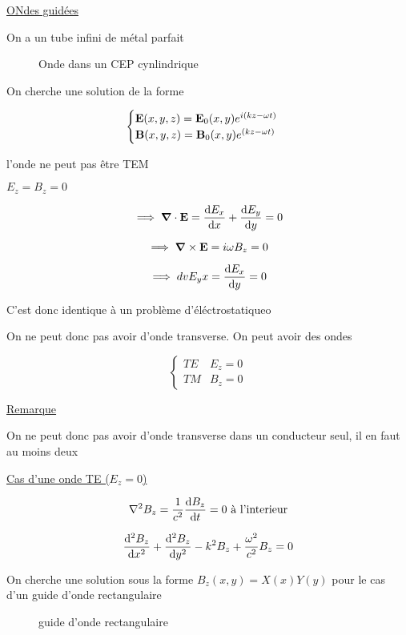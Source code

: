 


	
\underline{ONdes guidées} 

On a un tube infini de métal parfait


\begin{figure}[ht]
    \centering
    \caption{Onde dans un CEP cynlindrique}
    \label{fig:onde-dans-un-cep-cynlindrique}
\end{figure}

On cherche une solution de la forme 

$$\begin{cases}
	\vb{E}(x,y,z) = \vb{E}_0 (x,y) e^{i(kz-\omega t)}\\
	\vb{B}(x,y,z) = \vb{B}_0 (x,y) e^{(kz-\omega t	)}
\end{cases}$$ 

l'onde ne peut pas être TEM 

$E_{z}  = B_{z} = 0 $ 

$$\implies \grad \cdot \vb{E} = \dv{E_x}{x}+ \dv{E_y}{y} = 0$$ 

$$\implies \grad \times \vb{ E} = i\omega B_{z} = 0$$ 

$$\implies dv{E_y}{x} = \dv{E_x}{y} = 0$$ 

C'est donc identique à un problème d'éléctrostatiqueo

On ne peut donc pas avoir d'onde transverse. On peut avoir des ondes 

$$\begin{cases}
	TE & E_{z} =0\\
	TM & B_{z} =0 
\end{cases}$$ 

\underline{Remarque} 

On ne peut donc pas avoir d'onde transverse dans un conducteur seul, il en faut au moins deux

\underline{Cas d'une onde TE ($E_{z}  =0$)} 

$$\nabla^2B_{z} = \frac{1}{c^2} \dv{B_z}{t} = 0 \text{ à l'interieur}$$ 

$$\dv[2]{B_z}{x} + \dv[2]{B_z}{y} - k^2 B_{z} + \frac{\omega^2}{c^2} B_{z} = 0$$ 

On cherche une solution sous la forme $B_z(x,y) = X(x)Y(y)$ pour le cas d'un guide d'onde rectangulaire 

\begin{figure}[ht]
    \centering
    \caption{guide d'onde rectangulaire}
    \label{fig:guide-d'onde-rectangulaire}
\end{figure}


